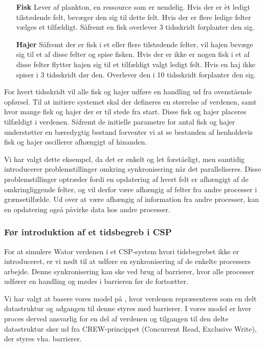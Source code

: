\begin{itemize}
\item[\textbf{Fisk}]
Lever af plankton, en ressource som er uendelig. Hvis der er èt ledigt 
tilstødende felt, bevæger den sig til dette felt. Hvis der er flere ledige 
felter vælges et tilfældigt. Såfremt en fisk overlever 3 tidsskridt forplanter 
den sig.
\item[\textbf{Hajer}]
Såfremt der er fisk i et eller flere tilstødende felter, vil hajen bevæge sig 
til et af disse felter og spise fisken. Hvis der er ikke er nogen fisk i et af 
disse felter flytter hajen sig til et tilfældigt valgt ledigt felt. Hvis en haj 
ikke spiser i 3 tidsskridt dør den. Overlever den i 10 tidsskridt forplanter 
den sig.
\end{itemize}

For hvert tidsskridt vil alle fisk og hajer udføre en handling ud fra
ovenstående opførsel.
Til at initiere systemet skal der defineres en størrelse af verdenen,
samt hvor mange fisk og hajer der er til stede fra start. Disse fisk og
hajer placeres tilfældigt i verdenen.
Såfremt de initielle parametre for antal fisk og hajer understøtter en 
bæredygtig bestand forventer vi at se bestanden af henholdsvis fisk og hajer 
oscillerer afhængigt af hinanden.

Vi har valgt dette eksempel, da det er enkelt og let forståeligt, men samtidig 
introducerer problemstillinger omkring synkronisering når det paralleliseres.  
Disse problemstillinger optræder fordi en opdatering af hvert felt er afhængigt 
af de omkringliggende felter, og vil derfor være afhængig af felter fra andre 
processer i grænsetilfælde. Ud over at være afhængig af information fra andre 
processer, kan en opdatering også påvirke data hos andre processer.   

\subsubsection*{Før introduktion af et tidsbegreb i CSP} For at simulere Wator 
verdenen i et CSP-system hvori tidsbegrebet ikke er introduceret, er vi nødt 
til at udføre en synkronisering af de enkelte processers arbejde. Denne 
synkronisering kan ske ved brug af barrierer, hvor alle processer udfører en 
handling og mødes i barrieren før de fortsætter.

Vi har valgt at basere vores model på \cite{crew}, hvor verdenen repræsenteres 
som en delt datastruktur og adgangen til denne styres med barrierer. I vores 
model er hver proces derved ansvarlig for en del af verdenen og tilgangen til 
den delte datastruktur sker ud fra CREW-princippet (Concurrent Read, Exclusive 
Write)\cite[5]{crew}, der styres vha. barrierer. 

